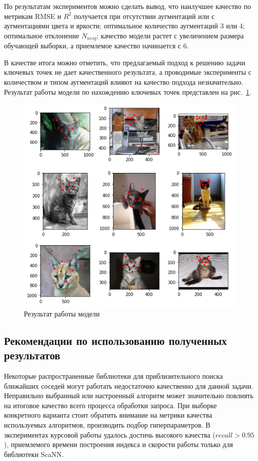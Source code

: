 \documentclass[a4paper,14pt]{article}
\begin{document}
    По результатам экспериментов можно сделать вывод, что наилучшее качество по метрикам RMSE и $R^2$ получается при отсутствии аугментаций или с аугментациями цвета и яркости; оптимальное количество аугментаций 3 или 4; оптимальное отклонение $N_{neig}$; качество модели растет с увеличением размера обучающей выборки, а приемлемое качество начинается с 6.
    
    В качестве итога можно отметить, что предлагаемый подход к решению задачи ключевых точек не дает качественного результата, а проводимые эксперименты с количеством и типом аугментаций влияют на качество подхода незначительно.
    Результат работы модели по нахождению ключевых точек представлен на рис.~\ref{fig:example_cat_dataset_model}.
    
    \begin{figure}[H]
    	\centering
    	\includegraphics[width=0.6\linewidth]{images/example_cat_dataset_model}
    	\caption{Результат работы модели}
    	\label{fig:example_cat_dataset_model}
    \end{figure}

    \subsection{Рекомендации по использованию полученных результатов}

    Некоторые распространенные библиотеки для приблизительного поиска ближайших соседей могут работать недостаточно качественно для данной задачи.
    Неправильно выбранный или настроенный алгоритм может значительно повлиять на итоговое качество всего процесса обработки запроса.
    При выборке конкретного варианта стоит обратить внимание на метрики качества используемых алгоритмов, производить подбор гиперпараметров.
    В экспериментах курсовой работы удалось достичь высокого качества ($recall > 0.95$), приемлемого времени построения индекса и скорости работы только для библиотеки ScaNN.
\end{document}
